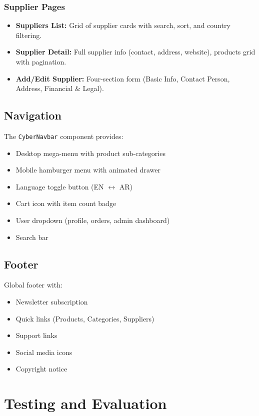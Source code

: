 \documentclass[12pt,a4paper]{report}
\begin{document}
\subsection{Supplier Pages}
\begin{itemize}[noitemsep]
  \item \textbf{Suppliers List:} Grid of supplier cards with search, sort, and country filtering.
  \item \textbf{Supplier Detail:} Full supplier info (contact, address, website), products grid with pagination.
  \item \textbf{Add/Edit Supplier:} Four-section form (Basic Info, Contact Person, Address, Financial \& Legal).
\end{itemize}

\section{Navigation}
The \texttt{CyberNavbar} component provides:
\begin{itemize}[noitemsep]
  \item Desktop mega-menu with product sub-categories
  \item Mobile hamburger menu with animated drawer
  \item Language toggle button (EN $\leftrightarrow$ AR)
  \item Cart icon with item count badge
  \item User dropdown (profile, orders, admin dashboard)
  \item Search bar
\end{itemize}

\section{Footer}
Global footer with:
\begin{itemize}[noitemsep]
  \item Newsletter subscription
  \item Quick links (Products, Categories, Suppliers)
  \item Support links
  \item Social media icons
  \item Copyright notice
\end{itemize}


\chapter{Testing and Evaluation}
\end{document}
